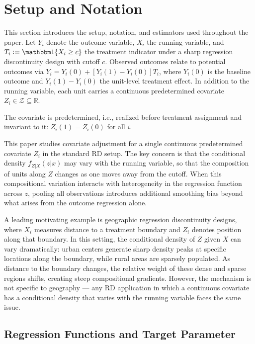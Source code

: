 \section{Setup and Notation}\label{sec:setup}

This section introduces the setup, notation, and estimators used throughout the paper.
Let $Y_i$ denote the outcome variable, $X_i$ the running variable, and $T_i \defeq \ind\{X_i \geq c\}$ the treatment indicator under a sharp regression discontinuity design with cutoff $c$.
Observed outcomes relate to potential outcomes via $Y_i = Y_i(0) + [Y_i(1) - Y_i(0)] T_i$, where $Y_i(0)$ is the baseline outcome and $Y_i(1) - Y_i(0)$ the unit-level treatment effect.
In addition to the running variable, each unit carries a continuous predetermined covariate $Z_i \in \mathcal{Z} \subseteq \mathbb{R}$.

\begin{assumption}\label{as:predetermined}
	The covariate is predetermined, i.e., realized before treatment assignment and invariant to it: $Z_i(1) = Z_i(0)$ for all $i$.
\end{assumption}

This paper studies covariate adjustment for a single continuous predetermined covariate $Z_i$ in the standard RD setup.
The key concern is that the conditional density $f_{Z|X}(z|x)$ may vary with the running variable, so that the composition of units along $Z$ changes as one moves away from the cutoff.
When this compositional variation interacts with heterogeneity in the regression function across $z$, pooling all observations introduces additional smoothing bias beyond what arises from the outcome regression alone.

A leading motivating example is geographic regression discontinuity designs, where $X_i$ measures distance to a treatment boundary and $Z_i$ denotes position along that boundary.
In this setting, the conditional density of $Z$ given $X$ can vary dramatically: urban centers generate sharp density peaks at specific locations along the boundary, while rural areas are sparsely populated.
As distance to the boundary changes, the relative weight of these dense and sparse regions shifts, creating steep compositional gradients.
However, the mechanism is not specific to geography --- any RD application in which a continuous covariate has a conditional density that varies with the running variable faces the same issue.

\subsection{Regression Functions and Target Parameter}\label{sec:setup:regression}

